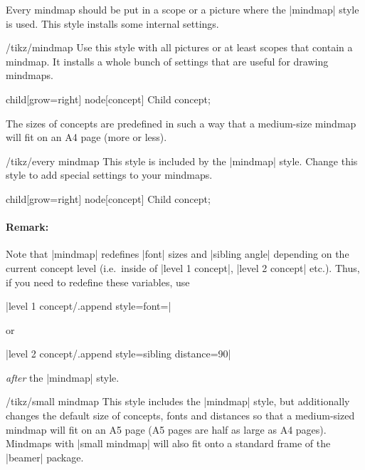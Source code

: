Every mindmap should be put in a scope or a picture where the |mindmap| style
is used. This style installs some internal settings.

\begin{stylekey}{/tikz/mindmap}
    Use this style with all pictures or at least scopes that contain a mindmap.
    It installs a whole bunch of settings that are useful for drawing mindmaps.
\begin{codeexample}[preamble={\usetikzlibrary{mindmap}}]
\tikz[mindmap,concept color=red!50]
    child[grow=right] {node[concept] {Child concept}};
\end{codeexample}
    The sizes of concepts are predefined in such a way that a medium-size
    mindmap will fit on an A4 page (more or less).
    \begin{stylekey}{/tikz/every mindmap}
        This style is included by the |mindmap| style. Change this style to add
        special settings to your mindmaps.
\begin{codeexample}[preamble={\usetikzlibrary{mindmap}}]
\tikz[large mindmap,concept color=red!50]
    child[grow=right] {node[concept] {Child concept}};
\end{codeexample}
    \end{stylekey}

    \paragraph{Remark:}
    Note that |mindmap| redefines |font| sizes and |sibling angle| depending on
    the current concept level (i.e.\ inside of |level 1 concept|,
    |level 2 concept| etc.). Thus, if you need to redefine these variables, use

    |level 1 concept/.append style={font=\small}|

    \noindent or

    |level 2 concept/.append style={sibling distance=90}|

    \noindent \emph{after} the |mindmap| style.
\end{stylekey}

\begin{stylekey}{/tikz/small mindmap}
    This style includes the |mindmap| style, but additionally changes the
    default size of concepts, fonts and distances so that a medium-sized
    mindmap will fit on an A5 page (A5 pages are half as large as A4 pages).
    Mindmaps with |small mindmap| will also fit onto a standard frame of the
    |beamer| package.
\end{stylekey}


